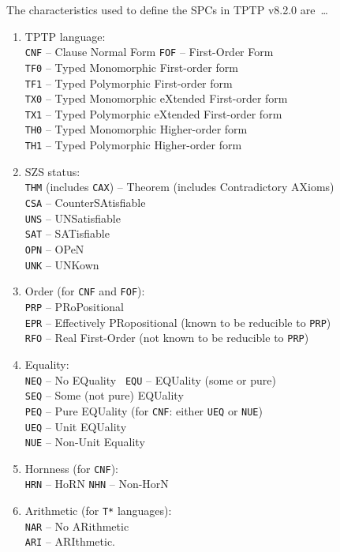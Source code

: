 \documentclass[runningheads]{llncs}
\begin{document}
The characteristics used to define the SPCs in TPTP v8.2.0 are~\ldots
\begin{enumerate}
\item TPTP language: \\
      {\tt CNF} -- Clause Normal Form
      {\tt FOF} -- First-Order Form \\
      {\tt TF0} -- Typed Monomorphic First-order form \\
      {\tt TF1} -- Typed Polymorphic First-order form \\
      {\tt TX0} -- Typed Monomorphic eXtended First-order form \\
      {\tt TX1} -- Typed Polymorphic eXtended First-order form \\
      {\tt TH0} -- Typed Monomorphic Higher-order form \\
      {\tt TH1} -- Typed Polymorphic Higher-order form
\item SZS status: \\
      {\tt THM} (includes {\tt CAX}) -- Theorem (includes Contradictory AXioms) \\
      {\tt CSA} -- CounterSAtisfiable \\
      {\tt UNS} -- UNSatisfiable \\
      {\tt SAT} -- SATisfiable \\
      {\tt OPN} -- OPeN  \\
      {\tt UNK} -- UNKown
\item Order (for {\tt CNF} and {\tt FOF}): \\
      {\tt PRP} -- PRoPositional \\
      {\tt EPR} -- Effectively PRopositional (known to be reducible to {\tt PRP}) \\
      {\tt RFO} -- Real First-Order (not known to be reducible to {\tt PRP})
\item Equality: \\
      {\tt NEQ} -- No EQuality \
      {\tt EQU} -- EQUality (some or pure) \\
      {\tt SEQ} -- Some (not pure) EQUality \\
      {\tt PEQ} -- Pure EQUality (for {\tt CNF}: either {\tt UEQ} or {\tt NUE}) \\
      {\tt UEQ} -- Unit EQUality \\
      {\tt NUE} -- Non-Unit Equality
\item Hornness (for {\tt CNF}): \\
      {\tt HRN} -- HoRN
      {\tt NHN} -- Non-HorN
\item Arithmetic (for {\tt T*} languages): \\
      {\tt NAR} -- No ARithmetic \\
      {\tt ARI} -- ARIthmetic.
\end{enumerate}
\end{document}
